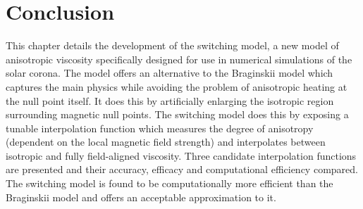 \section{Conclusion}

This chapter details the development of the switching model, a new model of anisotropic viscosity specifically designed for use in numerical simulations of the solar corona. The model offers an alternative to the Braginskii model which captures the main physics while avoiding the problem of anisotropic heating at the null point itself. It does this by artificially enlarging the isotropic region surrounding magnetic null points. The switching model does this by exposing a tunable interpolation function which measures the degree of anisotropy (dependent on the local magnetic field strength) and interpolates between isotropic and fully field-aligned viscosity. Three candidate interpolation functions are presented and their accuracy, efficacy and computational efficiency compared. The switching model is found to be computationally more efficient than the Braginskii model and offers an acceptable approximation to it. 
